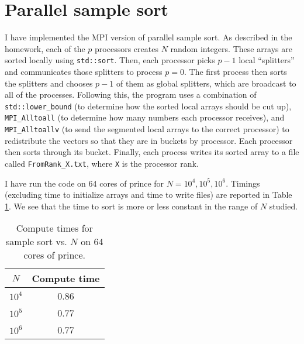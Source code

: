 \documentclass[a4paper]{article}
\begin{document}
\section{Parallel sample sort}
I have implemented the MPI version of parallel sample sort. As described in the homework, each of the $p$ processors creates $N$ random integers. These arrays are sorted locally using \texttt{std::sort}. Then, each processor picks $p-1$ local ``splitters'' and communicates those splitters to process $p=0$. The first process then sorts the splitters and chooses $p-1$ of them as global splitters, which are broadcast to all of the processes. Following this, the program uses a combination of \texttt{std::lower\_bound} (to determine how the sorted local arrays should be cut up), \texttt{MPI\_Alltoall} (to determine how many numbers each processor receives), and \texttt{MPI\_Alltoallv} (to send the segmented local arrays to the correct processor) to redistribute the vectors so that they are in buckets by processor. Each processor then sorts through its bucket. Finally, each process writes its sorted array to a file called \texttt{FromRank\_X.txt}, where \texttt{X} is the processor rank. 

I have run the code on 64 cores of prince for $N=10^4, 10^5, 10^6$. Timings (excluding time to initialize arrays and time to write files) are reported in Table \ref{tab:sort}. We see that the time to sort is more or less constant in the range of $N$ studied. 
\begin{table}
\centering
\begin{tabular}{c|c} 
$N$ & Compute time \\
\hline
$10^4$ & 0.86\\
$10^5$ & 0.77\\
$10^6$ & 0.77
\end{tabular}
\caption{Compute times for sample sort vs. $N$ on 64 cores of prince. }
\label{tab:sort}
\end{table}
\end{document}
